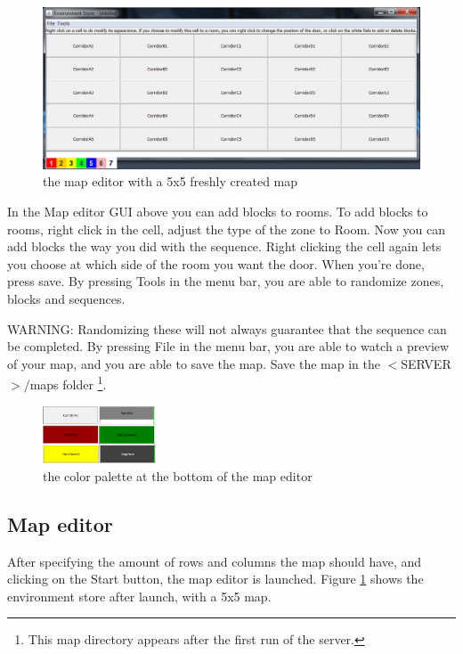 \begin{figure}
	\center
	\includegraphics[scale=0.55]{EnvironmentStore/MapEditor.png}
	\caption{the map editor with a 5x5 freshly created map}\label{fig:MapEditor}
\end{figure}

In the Map editor GUI above you can add blocks to rooms. To add blocks to rooms, right click in the cell, adjust the type of the zone to Room. Now you can add blocks the way you did with the sequence. Right clicking the cell again lets you choose at which side of the room you want the door. When you're done, press save. 
By pressing Tools in the menu bar, you are able to randomize zones, blocks and sequences.

WARNING: Randomizing these will not always guarantee that the sequence can be completed. By pressing File in the menu bar, you are able to watch a preview of your map, and you are able to save the map. Save the map in the $<$SERVER$>/$maps folder \footnote[1]{This map directory appears after the first run of the server.}.  


\begin{figure}
  \begin{center}
		\includegraphics[width=0.3\textwidth]{EnvironmentStore/DifferentRooms.png}
  \end{center}
\caption{the color palette at the bottom of the map editor}\label{fig:DifferentRooms}

\end{figure}

\subsection{Map editor}
After specifying the amount of rows and columns the map should have, and clicking on the Start button, 
the map editor is launched. Figure \ref{fig:MapEditor} shows the environment store after launch, with a 5x5 map.

